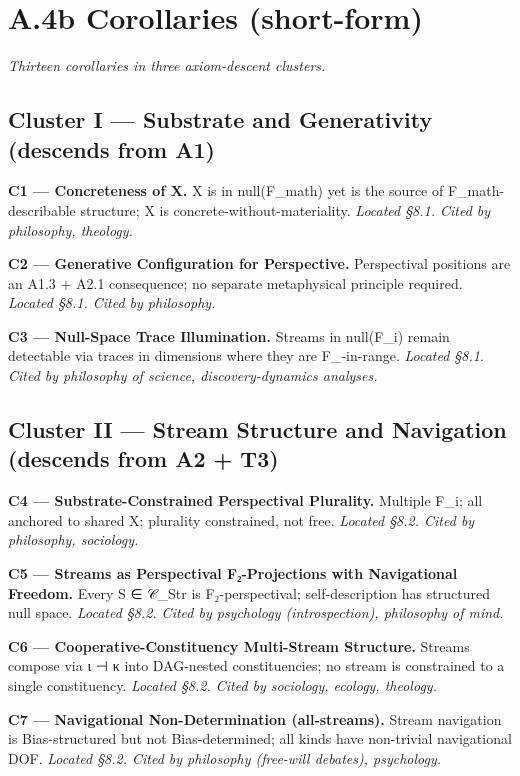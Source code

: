 \documentclass[11pt, openany]{book}
\begin{document}
\section{A.4b Corollaries (short-form)}

\textit{Thirteen corollaries in three axiom-descent clusters.}

\subsection{Cluster I --- Substrate and Generativity (descends from A1)}

\textbf{C1 --- Concreteness of X.} X is in null(F\_\allowbreak{}math) yet is the source of F\_\allowbreak{}math-describable structure; X is concrete-without-materiality. \textit{Located §8.1. Cited by philosophy, theology.}

\textbf{C2 --- Generative Configuration for Perspective.} Perspectival positions are an A1.3 + A2.1 consequence; no separate metaphysical principle required. \textit{Located §8.1. Cited by philosophy.}

\textbf{C3 --- Null-Space Trace Illumination.} Streams in null(F\_\allowbreak{}i) remain detectable via traces in dimensions where they are F\_-in-range. \textit{Located §8.1. Cited by philosophy of science, discovery-dynamics analyses.}

\subsection{Cluster II --- Stream Structure and Navigation (descends from A2 + T3)}

\textbf{C4 --- Substrate-Constrained Perspectival Plurality.} Multiple F\_\allowbreak{}i; all anchored to shared X; plurality constrained, not free. \textit{Located §8.2. Cited by philosophy, sociology.}

\textbf{C5 --- Streams as Perspectival F₂-Projections with Navigational Freedom.} Every S ∈ 𝒞\_\allowbreak{}Str is F₂-perspectival; self-description has structured null space. \textit{Located §8.2. Cited by psychology (introspection), philosophy of mind.}

\textbf{C6 --- Cooperative-Constituency Multi-Stream Structure.} Streams compose via ι ⊣ κ into DAG-nested constituencies; no stream is constrained to a single constituency. \textit{Located §8.2. Cited by sociology, ecology, theology.}

\textbf{C7 --- Navigational Non-Determination (all-streams).} Stream navigation is Bias-structured but not Bias-determined; all kinds have non-trivial navigational DOF. \textit{Located §8.2. Cited by philosophy (free-will debates), psychology.}
\end{document}
